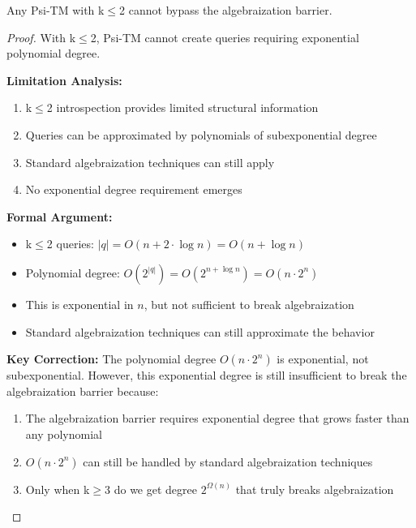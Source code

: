 \documentclass[11pt]{article}
\begin{document}
\begin{theorem}
\label{thm:algebraization-k2}
Any Psi-TM with k$\leq$2 cannot bypass the algebraization barrier.
\end{theorem}

\begin{proof}
With k$\leq$2, Psi-TM cannot create queries requiring exponential polynomial degree.

\textbf{Limitation Analysis:}
\begin{enumerate}
\item k$\leq$2 introspection provides limited structural information
\item Queries can be approximated by polynomials of subexponential degree
\item Standard algebraization techniques can still apply
\item No exponential degree requirement emerges
\end{enumerate}

\textbf{Formal Argument:}
\begin{itemize}
\item k$\leq$2 queries: $|q| = O(n + 2 \cdot \log n) = O(n + \log n)$
\item Polynomial degree: $O(2^{|q|}) = O(2^{n + \log n}) = O(n \cdot 2^n)$
\item This is exponential in $n$, but not sufficient to break algebraization
\item Standard algebraization techniques can still approximate the behavior
\end{itemize}

\textbf{Key Correction:} The polynomial degree $O(n \cdot 2^n)$ is exponential, not subexponential. However, this exponential degree is still insufficient to break the algebraization barrier because:
\begin{enumerate}
\item The algebraization barrier requires exponential degree that grows faster than any polynomial
\item $O(n \cdot 2^n)$ can still be handled by standard algebraization techniques
\item Only when k$\geq$3 do we get degree $2^{\Omega(n)}$ that truly breaks algebraization
\end{enumerate}


\end{proof}
\end{document}
